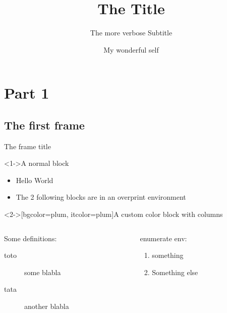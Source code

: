 \documentclass[presentation, aspectratio=169]{beamer}
\author{My wonderful self}
\date{\mydate}
\title{The Title}
\subtitle{The more verbose Subtitle}
\begin{document}
\maketitle
\section{Part 1}
\label{sec:part1}

\subsection{The first frame}
\label{sec:first_frame}

\begin{frame}{The frame title}

  \begin{block}<1->{A normal block}
    \begin{itemize}
    \item Hello World
    \item The 2 following blocks are in an overprint environment
    \end{itemize}
  \end{block}

  \begin{overprint}

    \begin{customblock}<2->[bgcolor=plum, itcolor=plum]{A custom color block with columns}
      \begin{columns}
        \begin{column}{0.6\columnwidth}
          Some definitions:
          \begin{description}
          \item[{toto}] some blabla
          \item[{tata}] another blabla
          \end{description}
        \end{column}

        \begin{column}{0.3\columnwidth}
          enumerate env:
          \begin{enumerate}
          \item something
          \item Something else
          \end{enumerate}
        \end{column}
      \end{columns}
    \end{customblock}


\end{overprint}
\end{frame}
\end{document}
